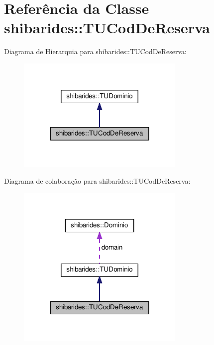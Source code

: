 \hypertarget{classshibarides_1_1TUCodDeReserva}{}\section{Referência da Classe shibarides\+:\+:T\+U\+Cod\+De\+Reserva}
\label{classshibarides_1_1TUCodDeReserva}


Diagrama de Hierarquia para shibarides\+:\+:T\+U\+Cod\+De\+Reserva\+:\nopagebreak
\begin{figure}[H]
\begin{center}
\leavevmode
\includegraphics[width=228pt]{classshibarides_1_1TUCodDeReserva__inherit__graph}
\end{center}
\end{figure}


Diagrama de colaboração para shibarides\+:\+:T\+U\+Cod\+De\+Reserva\+:\nopagebreak
\begin{figure}[H]
\begin{center}
\leavevmode
\includegraphics[width=228pt]{classshibarides_1_1TUCodDeReserva__coll__graph}
\end{center}
\end{figure}
